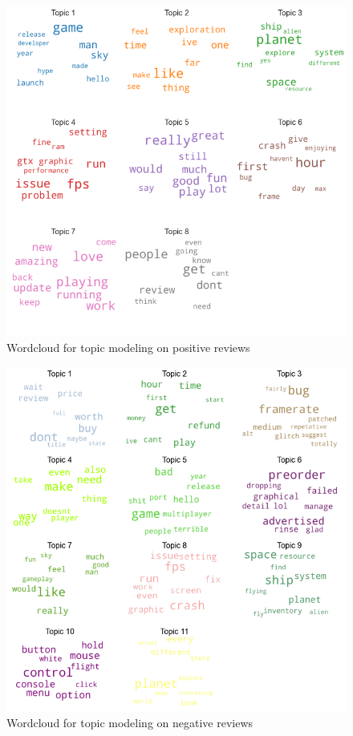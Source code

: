 \documentclass[12pt]{article}
\begin{document}
\begin{figure}[H]
\centering
\includegraphics[scale=0.6]{images/topic_positive.png}
\caption{Wordcloud for topic modeling on positive reviews}
\label{fig:wordcloudp}
\end{figure}

\begin{figure}[H]
\centering
\includegraphics[scale=0.6]{images/topic_negative.png}
\caption{Wordcloud for topic modeling on negative reviews}
\label{fig:wordcloudn}
\end{figure}
\end{document}
